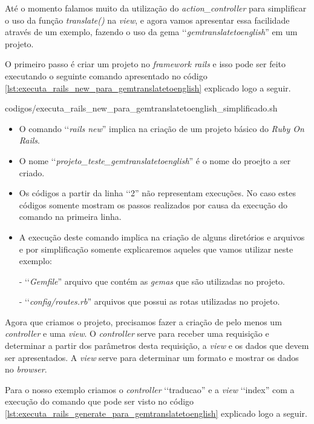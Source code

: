 Até o momento falamos muito da utilização do \emph{action\_controller} para simplificar o uso da função 
\emph{translate()} na \emph{view}, e agora vamos apresentar essa facilidade através de um exemplo, 
fazendo o uso da gema ‘‘\emph{gemtranslatetoenglish}'' em um projeto.

O primeiro passo é criar um projeto no \emph{framework rails} e isso pode ser feito executando 
o seguinte comando apresentado no código \ref{lst:executa_rails_new_para_gemtranslatetoenglish}
explicado logo a seguir.


{codigos/executa_rails_new_para_gemtranslatetoenglish_simplificado.sh} 

\begin{itemize}

 \item O comando ‘‘\emph{rails new}'' implica na criação de um projeto básico do \emph{Ruby On Rails}.
 
 \item O nome ‘‘\emph{projeto\_teste\_gemtranslatetoenglish}'' é o nome do proejto a ser criado.
 
  \item Os códigos a partir da linha ‘‘2'' não representam execuções. No caso estes códigos somente 
 mostram os passos realizados por causa da execução do comando na primeira linha.
 
 \item A execução deste comando implica na criação de alguns diretórios e arquivos e por simplificação 
 somente explicaremos aqueles que vamos utilizar neste exemplo:
  
  \subitem - ‘‘\emph{Gemfile}'' arquivo que contém as \emph{gemas} que são utilizadas no projeto.
 
  \subitem - ‘‘\emph{config/routes.rb}'' arquivos que possui as rotas utilizadas no projeto.
 
\end{itemize}

Agora que criamos o projeto, precisamos fazer a criação de pelo menos um \emph{controller} e uma \emph{view}.
O \emph{controller} serve para receber uma requisição e determinar a partir dos parâmetros desta 
requisição, a \emph{view} e os dados que devem ser apresentados. A \emph{view} serve para 
determinar um formato e mostrar os dados no \emph{browser}.

Para o nosso exemplo criamos o \emph{controller} ‘‘traducao'' e a \emph{view} ‘‘index'' com a execução do 
comando que pode ser visto no código \ref{lst:executa_rails_generate_para_gemtranslatetoenglish}
explicado logo a seguir.

